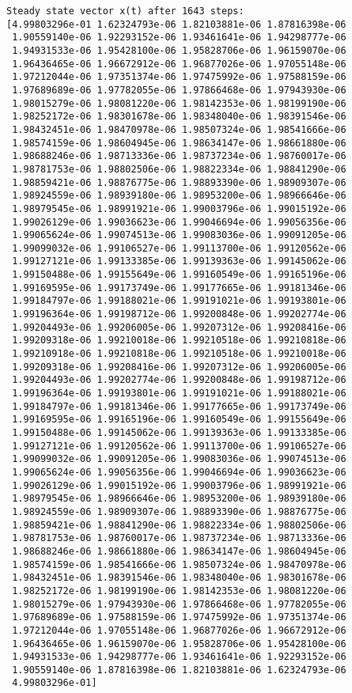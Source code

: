 \documentclass[11pt]{article}
\begin{document}
\begin{Verbatim}[commandchars=\\\{\}]
Steady state vector x(t) after 1643 steps:
[4.99803296e-01 1.62324793e-06 1.82103881e-06 1.87816398e-06
 1.90559140e-06 1.92293152e-06 1.93461641e-06 1.94298777e-06
 1.94931533e-06 1.95428100e-06 1.95828706e-06 1.96159070e-06
 1.96436465e-06 1.96672912e-06 1.96877026e-06 1.97055148e-06
 1.97212044e-06 1.97351374e-06 1.97475992e-06 1.97588159e-06
 1.97689689e-06 1.97782055e-06 1.97866468e-06 1.97943930e-06
 1.98015279e-06 1.98081220e-06 1.98142353e-06 1.98199190e-06
 1.98252172e-06 1.98301678e-06 1.98348040e-06 1.98391546e-06
 1.98432451e-06 1.98470978e-06 1.98507324e-06 1.98541666e-06
 1.98574159e-06 1.98604945e-06 1.98634147e-06 1.98661880e-06
 1.98688246e-06 1.98713336e-06 1.98737234e-06 1.98760017e-06
 1.98781753e-06 1.98802506e-06 1.98822334e-06 1.98841290e-06
 1.98859421e-06 1.98876775e-06 1.98893390e-06 1.98909307e-06
 1.98924559e-06 1.98939180e-06 1.98953200e-06 1.98966646e-06
 1.98979545e-06 1.98991921e-06 1.99003796e-06 1.99015192e-06
 1.99026129e-06 1.99036623e-06 1.99046694e-06 1.99056356e-06
 1.99065624e-06 1.99074513e-06 1.99083036e-06 1.99091205e-06
 1.99099032e-06 1.99106527e-06 1.99113700e-06 1.99120562e-06
 1.99127121e-06 1.99133385e-06 1.99139363e-06 1.99145062e-06
 1.99150488e-06 1.99155649e-06 1.99160549e-06 1.99165196e-06
 1.99169595e-06 1.99173749e-06 1.99177665e-06 1.99181346e-06
 1.99184797e-06 1.99188021e-06 1.99191021e-06 1.99193801e-06
 1.99196364e-06 1.99198712e-06 1.99200848e-06 1.99202774e-06
 1.99204493e-06 1.99206005e-06 1.99207312e-06 1.99208416e-06
 1.99209318e-06 1.99210018e-06 1.99210518e-06 1.99210818e-06
 1.99210918e-06 1.99210818e-06 1.99210518e-06 1.99210018e-06
 1.99209318e-06 1.99208416e-06 1.99207312e-06 1.99206005e-06
 1.99204493e-06 1.99202774e-06 1.99200848e-06 1.99198712e-06
 1.99196364e-06 1.99193801e-06 1.99191021e-06 1.99188021e-06
 1.99184797e-06 1.99181346e-06 1.99177665e-06 1.99173749e-06
 1.99169595e-06 1.99165196e-06 1.99160549e-06 1.99155649e-06
 1.99150488e-06 1.99145062e-06 1.99139363e-06 1.99133385e-06
 1.99127121e-06 1.99120562e-06 1.99113700e-06 1.99106527e-06
 1.99099032e-06 1.99091205e-06 1.99083036e-06 1.99074513e-06
 1.99065624e-06 1.99056356e-06 1.99046694e-06 1.99036623e-06
 1.99026129e-06 1.99015192e-06 1.99003796e-06 1.98991921e-06
 1.98979545e-06 1.98966646e-06 1.98953200e-06 1.98939180e-06
 1.98924559e-06 1.98909307e-06 1.98893390e-06 1.98876775e-06
 1.98859421e-06 1.98841290e-06 1.98822334e-06 1.98802506e-06
 1.98781753e-06 1.98760017e-06 1.98737234e-06 1.98713336e-06
 1.98688246e-06 1.98661880e-06 1.98634147e-06 1.98604945e-06
 1.98574159e-06 1.98541666e-06 1.98507324e-06 1.98470978e-06
 1.98432451e-06 1.98391546e-06 1.98348040e-06 1.98301678e-06
 1.98252172e-06 1.98199190e-06 1.98142353e-06 1.98081220e-06
 1.98015279e-06 1.97943930e-06 1.97866468e-06 1.97782055e-06
 1.97689689e-06 1.97588159e-06 1.97475992e-06 1.97351374e-06
 1.97212044e-06 1.97055148e-06 1.96877026e-06 1.96672912e-06
 1.96436465e-06 1.96159070e-06 1.95828706e-06 1.95428100e-06
 1.94931533e-06 1.94298777e-06 1.93461641e-06 1.92293152e-06
 1.90559140e-06 1.87816398e-06 1.82103881e-06 1.62324793e-06
 4.99803296e-01]



\end{Verbatim}
\end{document}
